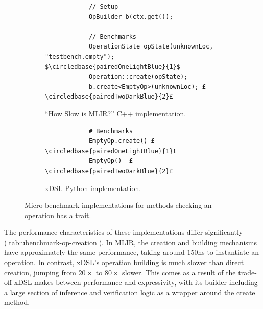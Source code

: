 \begin{figure}[H]
    \centering
    \begin{subfigure}[b]{0.45\textwidth}
       \centering
        \begin{verbatim}
            // Setup
            OpBuilder b(ctx.get());

            // Benchmarks
            OperationState opState(unknownLoc, "testbench.empty"); $\circledbase{pairedOneLightBlue}{1}$
            Operation::create(opState);
            b.create<EmptyOp>(unknownLoc); £\circledbase{pairedTwoDarkBlue}{2}£
        \end{verbatim}
        \caption{``How Slow is MLIR?'' C++ implementation.}
        \label{listing:ubenchmark-op-creation-bench-mlir}
    \end{subfigure}
    \hfill
    \begin{subfigure}[b]{0.45\textwidth}
        \centering
        \begin{verbatim}
            # Benchmarks
            EmptyOp.create() £\circledbase{pairedOneLightBlue}{1}£
            EmptyOp()  £\circledbase{pairedTwoDarkBlue}{2}£
        \end{verbatim}
        \footnotesize\vspace{3.5em}
        \caption{xDSL Python implementation.}
        \label{listing:ubenchmark-op-creation-bench-xdsl}
    \end{subfigure}
    \vspace{1em}
    \captionsetup{name=Listing}
    \caption{Micro-benchmark implementations for methods checking an operation has a trait.}
    \label{listing:ubenchmark-op-creation-bench}
\end{figure}

The performance characteristics of these implementations differ significantly (\autoref{tab:ubenchmark-op-creation}).
In MLIR, the creation and building mechanisms have approximately the same performance, taking around $150$ns to instantiate an operation. In contrast, xDSL's operation building is much slower than direct creation, jumping from $20\times$ to $80\times$ slower. This comes as a result of the trade-off xDSL makes between performance and expressivity, with its builder including a large section of inference and verification logic as a wrapper around the create method.


